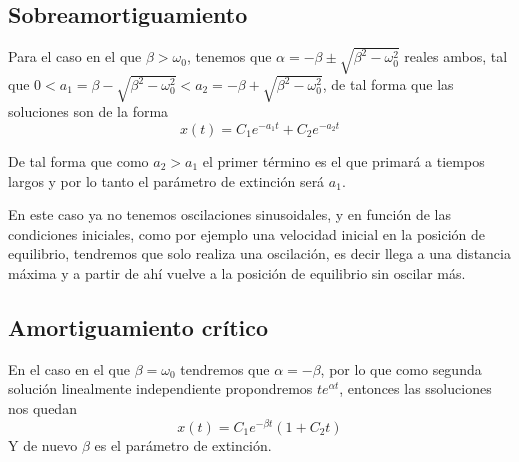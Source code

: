 \subsection{Sobreamortiguamiento}
Para el caso en el que $\beta > \omega_0$, tenemos que $\alpha = -\beta \pm \sqrt{\beta^2-\omega_0^2}$ reales ambos, tal que $0<a_1 =\beta - \sqrt{\beta^2-\omega_0^2} < a_2 = -\beta + \sqrt{\beta^2-\omega_0^2}$, de tal forma que las soluciones son de la forma
\begin{equation} \label{6.1.1}
    x(t) = C_1 e^{-a_1t}+ C_2 e^{-a_2t}
\end{equation}
De tal forma que como $a_2 > a_1$ el primer término es el que primará a tiempos largos y por lo tanto el parámetro de extinción será $a_1$.

En este caso ya no tenemos oscilaciones sinusoidales, y en función de las condiciones iniciales, como por ejemplo una velocidad inicial en la posición de equilibrio, tendremos que solo realiza una oscilación, es decir llega a una distancia máxima y a partir de ahí vuelve a la posición de equilibrio sin oscilar más.
\vspace{-15pt}
\subsection{Amortiguamiento crítico}

En el caso en el que $\beta = \omega_0$ tendremos que $\alpha = -\beta$, por lo que como segunda solución linealmente independiente propondremos $te^{\alpha t}$, entonces las ssoluciones nos quedan
\begin{equation} \label{6.1.1}
    x(t) = C_1 e^{-\beta t}(1+C_2t)
\end{equation}
Y de nuevo $\beta$ es el parámetro de extinción.

